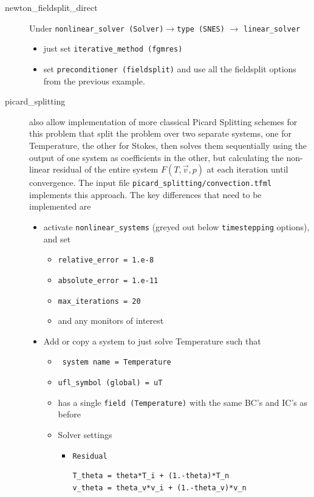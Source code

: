 \begin{description}
\begin{itemize}
\begin{itemize}
\begin{itemize}
      \end{itemize}
    \end{itemize}
  \end{itemize}
\item[newton\_fieldsplit\_direct] Under \texttt{nonlinear\_solver
    (Solver)}$\rightarrow$\texttt{type (SNES)} $\rightarrow$ \texttt{linear\_solver}
  \begin{itemize}
  \item just set \texttt{iterative\_method (fgmres)}
  \item set \texttt{preconditioner (fieldsplit)} and use all the
    fieldsplit options from the previous example.
\end{itemize}
\item[picard\_splitting] \TF{} also allow implementation of more
  classical Picard Splitting schemes for this problem that split the
  problem over two separate systems, one for Temperature, the other
  for Stokes, then solves them sequentially using the output of one
  system as coefficients in the other, but calculating the non-linear
  residual of the entire system $F(T,\vec{v},p)$ at each iteration
  until convergence.  The input file
  \texttt{picard\_splitting/convection.tfml} implements this
  approach.  The key differences that need to be implemented are
  \begin{itemize}
  \item activate \texttt{nonlinear\_systems} (greyed out below
    \texttt{timestepping} options), and set
    \begin{itemize}
    \item \texttt{relative\_error = 1.e-8}
    \item \texttt{absolute\_error = 1.e-11}
    \item \texttt{max\_iterations = 20}
    \item and any monitors of interest
    \end{itemize}
  \item Add or copy a system to just solve Temperature such that
    \begin{itemize}
    \item \texttt{ system name = Temperature}
    \item \texttt{ufl\_symbol (global) = uT}
    \item has a single \texttt{field (Temperature)} with the same BC's
      and IC's as before
    \item Solver settings
      \begin{itemize}
      \item \texttt{Residual}
        \begin{lstlisting}[style=ufl]
T_theta = theta*T_i + (1.-theta)*T_n
v_theta = theta_v*v_i + (1.-theta_v)*v_n


\end{lstlisting}
\end{itemize}
\end{itemize}
\end{itemize}
\end{description}
